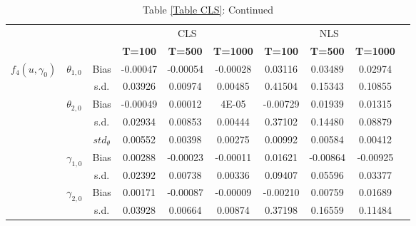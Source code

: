 \documentclass[a4paper,12pt,times,numbered,print,index]{report}
\numberwithin{equation}{section}
\begin{document}
	
	\begin{table}[htbp]
		\centering
		\caption*{Table \ref{Table CLS}: Continued}
		\begin{adjustbox}{max width=0.95\textwidth}
			\begin{tabular}{clcccccccc}
				\hline \hline
				&   &   & \multicolumn{3}{c}{CLS} & \multicolumn{3}{c}{NLS} \\
				& \multicolumn{1}{l}{} &   & \textbf{T=100} & \textbf{T=500} & \textbf{T=1000} & \textbf{T=100} & \textbf{T=500} & \textbf{T=1000} \\
				\hline
				
				
				\multirow{8}[1]{*}{$f_4(u,\gamma_{0})$} & \multirow{2}[1]{*}{$\theta_{1,0}$} & Bias & -0.00047 & -0.00054 & -0.00028 & 0.03116 & 0.03489 & 0.02974 \\
				&   & s.d. & 0.03926 & 0.00974 & 0.00485 & 0.41504 & 0.15343 & 0.10855 \\
				& \multirow{2}[0]{*}{$\theta_{2,0}$} & Bias & -0.00049 & 0.00012 & 4E-05 & -0.00729 & 0.01939 & 0.01315 \\
				&   & s.d. & 0.02934 & 0.00853 & 0.00444 & 0.37102 & 0.14480 & 0.08879 \\
				&	& $std_{\theta}$  & 0.00552 & 0.00398 & 0.00275 & 0.00992 & 0.00584 & 0.00412 \\
				& \multirow{2}[0]{*}{$\gamma_{1,0}$} & Bias & 0.00288 & -0.00023 & -0.00011 & 0.01621 & -0.00864 & -0.00925 \\
				&   & s.d. & 0.02392 & 0.00738 & 0.00336 & 0.09407 & 0.05596 & 0.03377 \\
				& \multirow{2}[0]{*}{$\gamma_{2,0}$} & Bias & 0.00171 & -0.00087 & -0.00009 & -0.00210 & 0.00759 & 0.01689 \\
				&   & s.d. & 0.03928 & 0.00664 & 0.00874 & 0.37198 & 0.16559 & 0.11484 \\
				
				\hline
				

\end{tabular}
\end{adjustbox}
\end{table}
\end{document}
